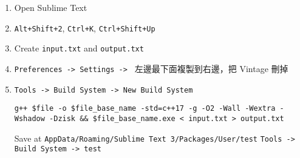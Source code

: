 \begin{enumerate}
    \item Open Sublime Text
    \item \texttt{Alt+Shift+2}, \texttt{Ctrl+K}, \texttt{Ctrl+Shift+Up}
    \item Create \texttt{input.txt} and \texttt{output.txt}
    \item \texttt{Preferences -> Settings -> } 左邊最下面複製到右邊，把 Vintage 刪掉
    \item \texttt{Tools -> Build System -> New Build System}
\begin{lstlisting}
g++ $file -o $file_base_name -std=c++17 -g -O2 -Wall -Wextra -Wshadow -Dzisk && $file_base_name.exe < input.txt > output.txt
\end{lstlisting}
    Save at \texttt{AppData/Roaming/Sublime Text 3/Packages/User/test}
    \texttt{Tools -> Build System -> test}
\end{enumerate}
